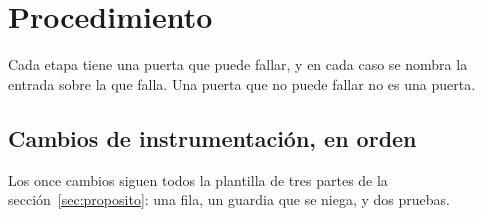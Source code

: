 \section{Procedimiento}
\label{sec:procedimiento}

Cada etapa tiene una puerta que puede fallar, y en cada caso se nombra la entrada
sobre la que falla. Una puerta que no puede fallar no es una puerta.

\subsection{Cambios de instrumentación, en orden}

Los once cambios siguen todos la plantilla de tres partes de la
sección~\ref{sec:proposito}: una fila, un guardia que se niega, y dos pruebas.


